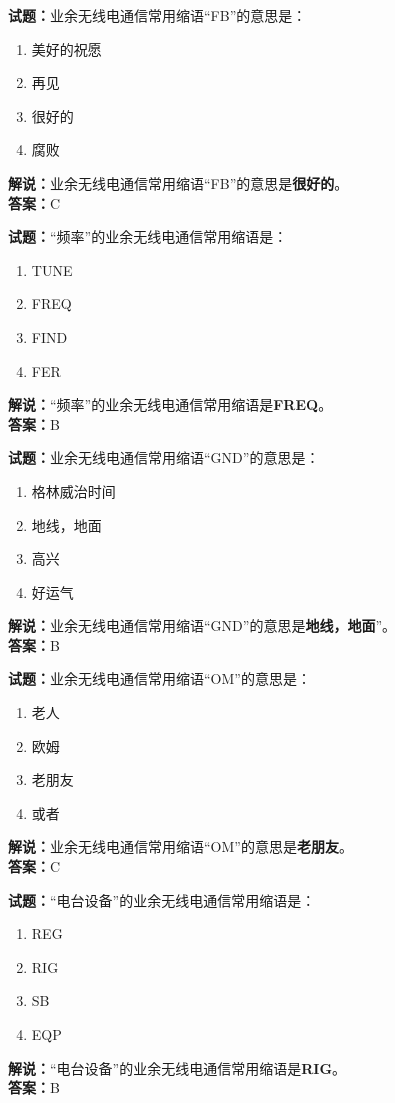 \documentclass{ctexbook}
\begin{document}
\noindent\textbf{试题：}业余无线电通信常用缩语“FB”的意思是：
\begin{enumerate}[leftmargin=3em]
\item 美好的祝愿
\item 再见
\item 很好的
\item 腐败
\end{enumerate}
\noindent\textbf{解说：}业余无线电通信常用缩语“FB”的意思是\textbf{很好的}。\\\noindent\textbf{答案：}C

\bigskip


\noindent\textbf{试题：}“频率”的业余无线电通信常用缩语是：
\begin{enumerate}[leftmargin=3em]
\item TUNE
\item FREQ
\item FIND
\item FER
\end{enumerate}
\noindent\textbf{解说：}“频率”的业余无线电通信常用缩语是\textbf{FREQ}。\\\noindent\textbf{答案：}B

\bigskip


\noindent\textbf{试题：}业余无线电通信常用缩语“GND”的意思是：
\begin{enumerate}[leftmargin=3em]
\item 格林威治时间
\item 地线，地面
\item 高兴
\item 好运气
\end{enumerate}
\noindent\textbf{解说：}业余无线电通信常用缩语“GND”的意思是\textbf{地线，地面}”。\\\noindent\textbf{答案：}B

\bigskip


\noindent\textbf{试题：}业余无线电通信常用缩语“OM”的意思是：
\begin{enumerate}[leftmargin=3em]
\item 老人
\item 欧姆
\item 老朋友
\item 或者
\end{enumerate}
\noindent\textbf{解说：}业余无线电通信常用缩语“OM”的意思是\textbf{老朋友}。\\\noindent\textbf{答案：}C

\bigskip


\noindent\textbf{试题：}“电台设备”的业余无线电通信常用缩语是：
\begin{enumerate}[leftmargin=3em]
\item REG
\item RIG
\item SB
\item EQP
\end{enumerate}
\noindent\textbf{解说：}“电台设备”的业余无线电通信常用缩语是\textbf{RIG}。\\\noindent\textbf{答案：}B
\end{document}
